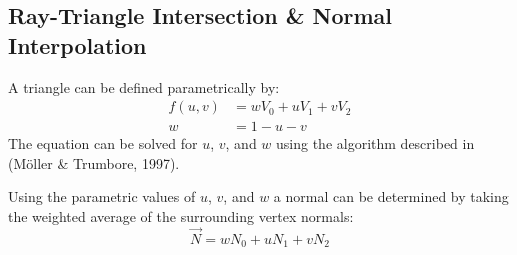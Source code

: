 \subsection{Ray-Triangle Intersection \& Normal Interpolation}
A triangle can be defined parametrically by:
\begin{equation}
\begin{split}
  f(u, v) &= wV_{0} + uV_{1} + vV_{2} \\
  w &= 1 - u - v
\end{split}
\end{equation}
The equation can be solved for $u$, $v$, and $w$ using the algorithm described
in (M{\"o}ller \& Trumbore, 1997).

Using the parametric values of $u$, $v$, and $w$ a normal can be determined by
taking the weighted average of the surrounding vertex normals:
\begin{equation}
  \vec{N} = wN_{0} + uN_{1} + vN_{2}
\end{equation}

